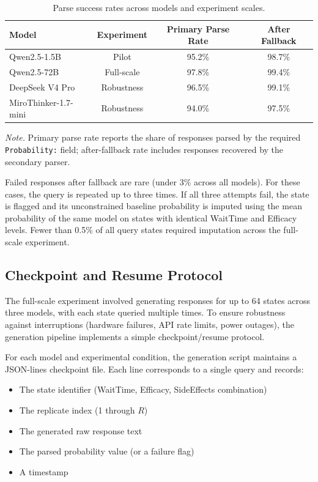 \documentclass[11pt]{article}
\begin{document}
\begin{table}[htbp]
\centering
\caption{Parse success rates across models and experiment scales.}
\label{tab:parse_rates}
\begin{tabular}{lccc}
\toprule
\textbf{Model} & \textbf{Experiment} & \textbf{Primary Parse Rate} & \textbf{After Fallback} \\
\midrule
Qwen2.5-1.5B  & Pilot         & 95.2\% & 98.7\% \\
Qwen2.5-72B   & Full-scale    & 97.8\% & 99.4\% \\
DeepSeek V4 Pro & Robustness  & 96.5\% & 99.1\% \\
MiroThinker-1.7-mini & Robustness & 94.0\% & 97.5\% \\
\bottomrule
\end{tabular}
\end{table}

\textit{Note.} Primary parse rate reports the share of responses parsed by the required \texttt{Probability:} field; after-fallback rate includes responses recovered by the secondary parser.

Failed responses after fallback are rare (under 3\% across all models). For these cases, the query is repeated up to three times. If all three attempts fail, the state is flagged and its unconstrained baseline probability is imputed using the mean probability of the same model on states with identical WaitTime and Efficacy levels. Fewer than 0.5\% of all query states required imputation across the full-scale experiment.

\subsection{Checkpoint and Resume Protocol}
\label{app:checkpoint}

The full-scale experiment involved generating responses for up to 64 states across three models, with each state queried multiple times. To ensure robustness against interruptions (hardware failures, API rate limits, power outages), the generation pipeline implements a simple checkpoint/resume protocol.

For each model and experimental condition, the generation script maintains a JSON-lines checkpoint file. Each line corresponds to a single query and records:

\begin{itemize}
    \item The state identifier (WaitTime, Efficacy, SideEffects combination)
    \item The replicate index (1 through $R$)
    \item The generated raw response text
    \item The parsed probability value (or a failure flag)
    \item A timestamp
\end{itemize}
\end{document}
